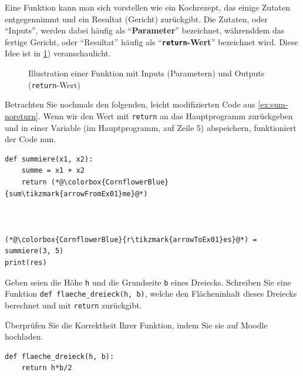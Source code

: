 Eine Funktion kann man sich vorstellen wie ein Kochrezept, das einige Zutaten entgegennimmt und ein Resultat (Gericht) zurückgibt. Die Zutaten, oder ``Inputs'', werden dabei häufig als ``\textbf{Parameter}'' bezeichnet, währenddem das fertige Gericht, oder ``Resultat'' häufig als ``\textbf{\lstinline|return|-Wert}'' bezeichnet wird. Diese Idee ist in \cref{fig:funktion-einzeln}) veranschaulicht.

\begin{figure}[H]
\centering
{}
\caption{Illustration einer Funktion mit Inputs (Parametern) und Outputs (\lstinline|return|-Wert)}
\label{fig:funktion-einzeln}
\end{figure}

\begin{myexample}
Betrachten Sie nochmals den folgenden, leicht modifizierten Code aus \cref{ex:sum-noreturn}. Wenn wir den Wert mit \lstinline|return| an das Hauptprogramm zurückgeben und in einer Variable (im Hauptprogramm, auf Zeile 5) abspeichern, funktioniert der Code nun.
\begin{lstlisting}
def summiere(x1, x2):
    summe = x1 + x2
    return (*@\colorbox{CornflowerBlue}{sum\tikzmark{arrowFromEx01}me}@*)
    


(*@\colorbox{CornflowerBlue}{r\tikzmark{arrowToEx01}es}@*) = summiere(3, 5)
print(res)
\end{lstlisting}
\end{myexample}

\begin{mysubmission}
Geben seien die Höhe \texttt{h} und die Grundseite \texttt{b} eines Dreiecks. Schreiben Sie eine Funktion \lstinline|def flaeche_dreieck(h, b)|, welche den Flächeninhalt dieses Dreiecks berechnet und mit \lstinline|return| zurückgibt.

Überprüfen Sie die Korrektheit Ihrer Funktion, indem Sie sie auf Moodle hochladen.
\begin{myanswer}
\begin{lstlisting}
def flaeche_dreieck(h, b):
    return h*b/2
\end{lstlisting}
\end{myanswer}
\end{mysubmission}

